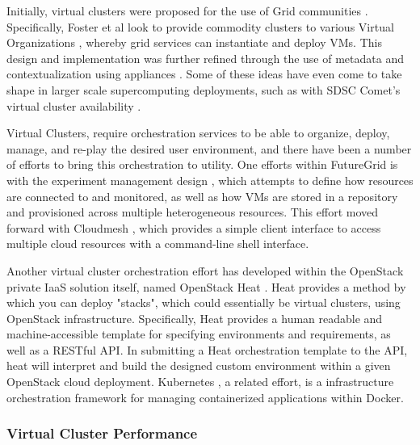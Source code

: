 Initially, virtual clusters were proposed for the use of Grid communities \cite{Foster2006}. Specifically, Foster et al look to provide commodity clusters to various Virtual Organizations \cite{foster2001}, whereby grid services can instantiate and deploy VMs. This design and implementation was further refined through the use of metadata and contextualization using appliances \cite{keahey2008contextualization}. Some of these ideas have even come to take shape in larger scale supercomputing deployments, such as with SDSC Comet's virtual cluster availability \cite{Moore2014}.

Virtual Clusters, require orchestration services to be able to organize, deploy, manage, and re-play the desired user environment, and there have been a number of efforts to bring this orchestration to utility. One efforts within FutureGrid is with the experiment management design \cite{las2010gce}, which attempts to define how resources are connected to and monitored, as well as how VMs are stored in a repository and provisioned across multiple heterogeneous resources. This effort moved forward with  Cloudmesh \cite{von2014cloudmesh}, which provides a simple client interface to access multiple cloud resources with a command-line shell interface. 

Another virtual cluster orchestration effort has developed within the OpenStack private IaaS solution itself, named OpenStack Heat \cite{www-openstack-heat}. Heat provides a method by which you can deploy "stacks", which could essentially be virtual clusters,  using OpenStack infrastructure. Specifically, Heat provides a human readable and machine-accessible template for specifying environments and requirements, as well as a RESTful API. In submitting a Heat orchestration template to the API, heat will interpret and build the designed custom environment within a given OpenStack cloud deployment. Kubernetes \cite{bernstein2014containers}, a related effort, is a infrastructure orchestration framework for managing containerized applications within Docker.  




\subsubsection{Virtual Cluster Performance}

